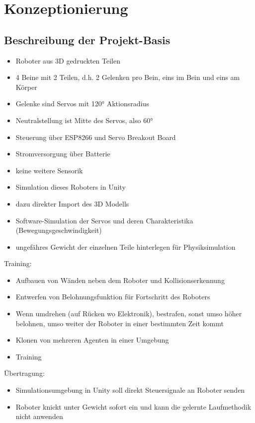 \chapter{Konzeptionierung}
\section{Beschreibung der Projekt-Basis}
\begin{itemize}
    \item Roboter aus 3D gedruckten Teilen
    \item 4 Beine mit 2 Teilen, d.h. 2 Gelenken pro Bein, eins im Bein und eins am Körper
    \item Gelenke sind Servos mit 120° Aktionsradius
    \item Neutralstellung ist Mitte des Servos, also 60°
    \item Steuerung über ESP8266 und Servo Breakout Board
    \item Stromversorgung über Batterie
    \item keine weitere Sensorik
    
    \item Simulation dieses Roboters in Unity
    \item dazu direkter Import des 3D Modells
    \item Software-Simulation der Servos und deren Charakteristika (Bewegungsgeschwindigkeit)
    \item ungefähres Gewicht der einzelnen Teile hinterlegen für Physiksimulation
\end{itemize}

Training:
\begin{itemize}
    \item Aufbauen von Wänden neben dem Roboter und Kollisionserkennung
    \item Entwerfen von Belohnungsfunktion für Fortschritt des Roboters
    \item Wenn umdrehen (auf Rücken wo Elektronik), bestrafen, sonst umso höher belohnen, umso weiter der Roboter in einer bestimmten Zeit kommt
    \item Klonen von mehreren Agenten in einer Umgebung
    \item Training
\end{itemize}

Übertragung:
\begin{itemize}
    \item Simulationsumgebung in Unity soll direkt Steuersignale an Roboter senden
    \item Roboter knickt unter Gewicht sofort ein und kann die gelernte Laufmethodik nicht anwenden
\end{itemize}

